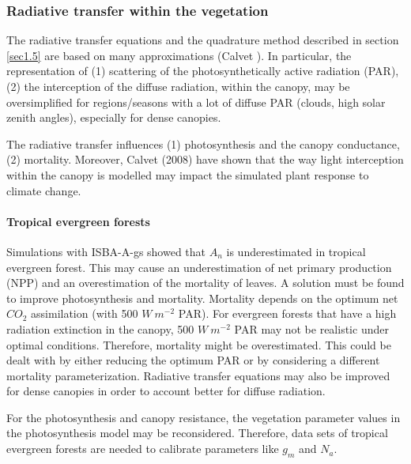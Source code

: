 {%
\subsubsection{Radiative transfer within the vegetation}

The radiative transfer equations and the quadrature method described in section \ref{sec1.5} are based on
many approximations (Calvet ). In particular, the representation of (1) scattering of the
photosynthetically active radiation (PAR), (2) the interception of the diffuse radiation, within the
canopy, may be oversimplified for regions/seasons with a lot of diffuse PAR (clouds, high solar zenith
angles), especially for dense canopies.

The radiative transfer influences (1) photosynthesis and the canopy conductance, (2) mortality.
Moreover, Calvet \etal (2008) have shown that the way light interception within the canopy is modelled
may impact the simulated plant response to climate change.

\paragraph{Tropical evergreen forests}

Simulations with ISBA-A-gs showed that $A_{n}$ is underestimated in tropical evergreen forest. This may
cause an underestimation of net primary production (NPP) and an overestimation of the mortality of
leaves. A solution must be found to improve photosynthesis and mortality. Mortality depends on the
optimum net $CO_{2}$ assimilation (with 500 $W ~m^{-2}$
PAR). For evergreen forests that have a high radiation
extinction in the canopy, 500 $W ~m^{-2}$ PAR may not be realistic under optimal conditions. Therefore,
mortality might be overestimated. This could be dealt with by either reducing the optimum PAR or by
considering a different mortality parameterization. Radiative transfer equations may also be improved
for dense canopies in order to account better for diffuse radiation.

For the photosynthesis and canopy resistance, the vegetation parameter values in the photosynthesis
model may be reconsidered. Therefore, data sets of tropical evergreen forests are needed to calibrate
parameters like $g_{m}$ and $N_{a}$.

}

